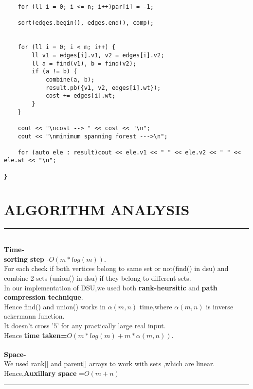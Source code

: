 \documentclass[10pt]{article}
\begin{document}
\begin{lstlisting}
	for (ll i = 0; i <= n; i++)par[i] = -1;

	sort(edges.begin(), edges.end(), comp);


	for (ll i = 0; i < m; i++) {
		ll v1 = edges[i].v1, v2 = edges[i].v2;
		ll a = find(v1), b = find(v2);
		if (a != b) {
			combine(a, b);
			result.pb({v1, v2, edges[i].wt});
			cost += edges[i].wt;
		}
	}

	cout << "\ncost --> " << cost << "\n";
	cout << "\nminimum spanning forest --->\n";

	for (auto ele : result)cout << ele.v1 << " " << ele.v2 << " " << ele.wt << "\n";

}

\end{lstlisting}




\section*{ALGORITHM ANALYSIS}


\rule{9cm}{1pt}\\
{
 \textbf{ Time-}\\
    \textbf{ sorting step} -\(O(m*log(m))\).\\
     For each check if both vertices belong to same set or not(find() in dsu) and combine 2 sets (union() in dsu) if they belong to different sets.\\

   In our implementation of DSU,we used both\textbf{ rank-heursitic} and \textbf{path compression technique}.\\
  Hence find() and union() works in \(\alpha(m,n)\) time,where \(\alpha(m,n)\) is inverse ackermann function.\\
  It doesn't cross '5' for any practically large real input.\\
  Hence \textbf{time taken}\textbf{=\(O(m*log(m)+m*\alpha(m,n))\)}.\\\\
 \textbf{Space- }\\
 We used rank[] and parent[] arrays to work with sets ,which are linear.\\
 Hence,\textbf{Auxillary space} =\(O(m+n)\)\\


 }
\rule{9cm}{1pt}
\end{document}
